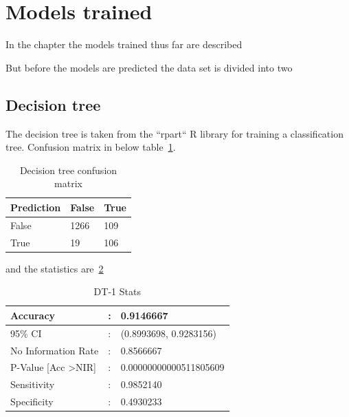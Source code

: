 \newpage
\section{Models trained}

In the chapter the models trained thus far are described

But before the models are predicted the data set is divided into two 

\subsection{Decision tree}
The decision tree is taken from the ``rpart`` R library for training a classification tree. 
Confusion matrix in below table~\ref{dt-cm}.
	\begin{table}[H]
		\centering
		\caption{Decision tree confusion matrix}
		\label{dt-cm}
		\begin{tabular}{lll}
			\hline
			Prediction & False & True \\
			\hline
			False & 1266 & 109 \\
			\hline
			True & 19 & 106 \\
			\hline
		\end{tabular}
	\end{table}
and the statistics are~\ref{dt-1-stats}
	\begin{table}[H]
		\centering
		\caption{DT-1 Stats}
		\label{dt-1-stats}
		\begin{tabular}{p{5cm}p{1cm}p{5cm}}
			Accuracy  & : & 0.9146667 \\
			\hline
			95\% CI   & : & (0.8993698, 0.9283156) \\ \hline
			No Information Rate  & : & 0.8566667 \\ \hline
			P-Value {[}Acc \textgreater NIR{]}  & : & 0.00000000000511805609 \\ \hline
			Sensitivity  & : & 0.9852140 \\ \hline
			Specificity  & : & 0.4930233 \\ \hline
			
		\end{tabular}
	\end{table}
	
